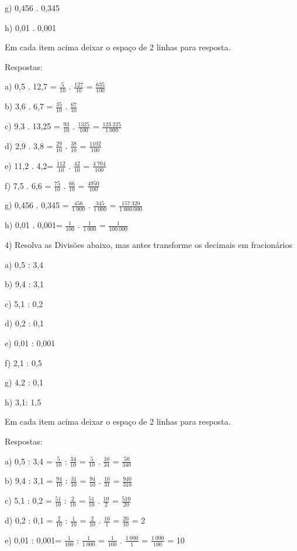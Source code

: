 g) 0,456 . 0,345

h) 0,01 . 0,001

Em cada item acima deixar o espaço de 2 linhas para resposta.

Respostas:

a) 0,5 . 12,7 = \(\frac{5}{10}\) . \(\frac{127}{10}\) =
\(\frac{635}{100}\)

b) 3,6 . 6,7 = \(\frac{35}{10}\) . \(\frac{67}{10}\)

c) 9,3 . 13,25 = \(\frac{93}{10}\) . \(\frac{1325}{100}\) =
\(\frac{123\ 225}{1\ 000}\)

d) 2,9 . 3,8 = \(\frac{29}{10}\) . \(\frac{38}{10}\) =
\(\frac{1102}{100}\)

e) 11,2 . 4,2= \(\frac{112}{10}\) . \(\frac{42}{10}\) =
\(\frac{4\ 704}{100}\)

f) 7,5 . 6,6 = \(\frac{75}{10}\) . \(\frac{66}{10}\) =
\(\frac{4950}{100}\)

g) 0,456 . 0,345 = \(\frac{456}{1\ 000}\) . \(\frac{345}{1\ 000}\) =
\(\frac{157\ 320}{1\ 000\ 000}\)

h) 0,01 . 0,001= \(\frac{1}{100}\) . \(\frac{1}{1\ 000}\) =
\(\frac{1}{100\ 000}\)

4) Resolva as Divisões abaixo, mas antes transforme os decimais em
fracionários

a) 0,5 : 3,4

b) 9,4 : 3,1

c) 5,1 : 0,2

d) 0,2 : 0,1

e) 0,01 : 0,001

f) 2,1 : 0,5

g) 4,2 : 0,1

h) 3,1: 1,5

Em cada item acima deixar o espaço de 2 linhas para resposta.

Respostas:

a) 0,5 : 3,4 = \(\frac{5}{10}\) : \(\frac{34}{10}\) = \(\frac{5}{10}\) .
\(\frac{10}{34}\) = \(\frac{50}{340}\)

b) 9,4 : 3,1 = \(\frac{94}{10}\) : \(\frac{31}{10}\) = \(\frac{94}{10}\)
. \(\frac{10}{31}\) = \(\frac{940}{310}\)

c) 5,1 : 0,2 = \(\frac{51}{10}\) : \(\frac{2}{10}\) = \(\frac{51}{10}\)
. \(\frac{10}{2}\) = \(\frac{510}{20}\)

d) 0,2 : 0,1 = \(\frac{2}{10}\) : \(\frac{1}{10}\) = \(\frac{2}{10}\) .
\(\frac{10}{1}\) = \(\frac{20}{10}\) = 2

e) 0,01 : 0,001= \(\frac{1}{100}\) : \(\frac{1}{1\ 000}\) =
\(\frac{1}{100}\) . \(\frac{1\ 000}{1}\) = \(\frac{1\ 000}{100}\) = 10


